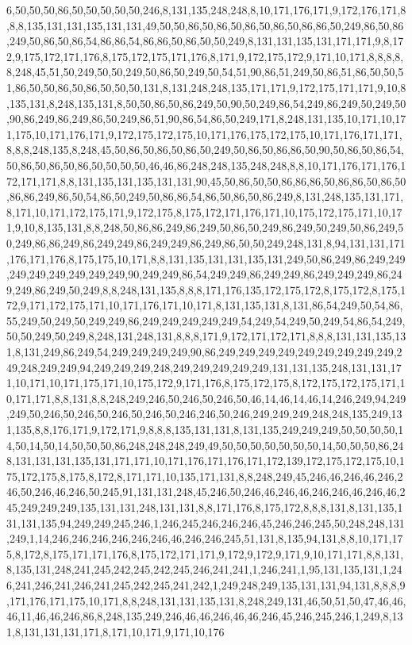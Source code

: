 6,50,50,50,86,50,50,50,50,50,246,8,131,135,248,248,8,10,171,176,171,9,172,176,171,8,8,8,135,131,131,135,131,131,49,50,50,86,50,86,50,86,50,86,50,86,86,50,249,86,50,86,249,50,86,50,86,54,86,86,54,86,86,50,86,50,50,249,8,131,131,135,131,171,171,9,8,172,9,175,172,171,176,8,175,172,175,171,176,8,171,9,172,175,172,9,171,10,171,8,8,8,8,8,248,45,51,50,249,50,50,249,50,86,50,249,50,54,51,90,86,51,249,50,86,51,86,50,50,51,86,50,50,86,50,86,50,50,50,131,8,131,248,248,135,171,171,9,172,175,171,171,9,10,8,135,131,8,248,135,131,8,50,50,86,50,86,249,50,90,50,249,86,54,249,86,249,50,249,50,90,86,249,86,249,86,50,249,86,51,90,86,54,86,50,249,171,8,248,131,135,10,171,10,171,175,10,171,176,171,9,172,175,172,175,10,171,176,175,172,175,10,171,176,171,171,8,8,8,248,135,8,248,45,50,86,50,86,50,86,50,249,50,86,50,86,86,50,90,50,86,50,86,54,50,86,50,86,50,86,50,50,50,50,46,46,86,248,248,135,248,248,8,8,10,171,176,171,176,172,171,171,8,8,131,135,131,135,131,131,90,45,50,86,50,50,86,86,86,50,86,86,50,86,50,86,86,249,86,50,54,86,50,249,50,86,86,54,86,50,86,50,86,249,8,131,248,135,131,171,8,171,10,171,172,175,171,9,172,175,8,175,172,171,176,171,10,175,172,175,171,10,171,9,10,8,135,131,8,8,248,50,86,86,249,86,249,50,86,50,249,86,249,50,249,50,86,249,50,249,86,86,249,86,249,249,86,249,249,86,249,86,50,50,249,248,131,8,94,131,131,171,176,171,176,8,175,175,10,171,8,8,131,135,131,131,135,131,249,50,86,249,86,249,249,249,249,249,249,249,249,90,249,249,86,54,249,249,86,249,249,86,249,249,249,86,249,249,86,249,50,249,8,8,248,131,135,8,8,8,171,176,135,172,175,172,8,175,172,8,175,172,9,171,172,175,171,10,171,176,171,10,171,8,131,135,131,8,131,86,54,249,50,54,86,55,249,50,249,50,249,249,86,249,249,249,249,249,54,249,54,249,50,249,54,86,54,249,50,50,249,50,249,8,248,131,248,131,8,8,8,171,9,172,171,172,171,8,8,8,131,131,135,131,8,131,249,86,249,54,249,249,249,249,90,86,249,249,249,249,249,249,249,249,249,249,248,249,249,94,249,249,249,248,249,249,249,249,249,131,131,135,248,131,131,171,10,171,10,171,175,171,10,175,172,9,171,176,8,175,172,175,8,172,175,172,175,171,10,171,171,8,8,131,8,8,248,249,246,50,246,50,246,50,46,14,46,14,46,14,246,249,94,249,249,50,246,50,246,50,246,50,246,50,246,246,50,246,249,249,249,248,248,135,249,131,135,8,8,176,171,9,172,171,9,8,8,8,135,131,131,8,131,135,249,249,249,50,50,50,50,14,50,14,50,14,50,50,50,86,248,248,248,249,49,50,50,50,50,50,50,50,14,50,50,50,86,248,131,131,131,135,131,171,171,10,171,176,171,176,171,172,139,172,175,172,175,10,175,172,175,8,175,8,172,8,171,171,10,135,171,131,8,8,248,249,45,246,46,246,46,246,246,50,246,46,246,50,245,91,131,131,248,45,246,50,246,46,246,46,246,246,46,246,46,245,249,249,249,135,131,131,248,131,131,8,8,171,176,8,175,172,8,8,8,131,8,131,135,131,131,135,94,249,249,245,246,1,246,245,246,246,246,45,246,246,245,50,248,248,131,249,1,14,246,246,246,246,246,246,46,246,246,245,51,131,8,135,94,131,8,8,10,171,175,8,172,8,175,171,171,176,8,175,172,171,171,9,172,9,172,9,171,9,10,171,171,8,8,131,8,135,131,248,241,245,242,245,242,245,246,241,241,1,246,241,1,95,131,135,131,1,246,241,246,241,246,241,245,242,245,241,242,1,249,248,249,135,131,131,94,131,8,8,8,9,171,176,171,175,10,171,8,8,248,131,131,135,131,8,248,249,131,46,50,51,50,47,46,46,46,11,46,46,246,86,8,248,135,249,246,46,46,246,46,46,246,45,246,245,246,1,249,8,131,8,131,131,131,171,8,171,10,171,9,171,10,176